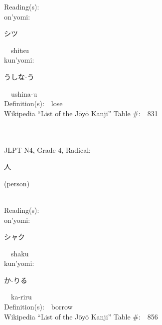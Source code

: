 \begin{multicols}{2}
Reading(s):\ \ \\
{\hspace*{1em}}on'yomi:\ \ \\
{\hspace*{2em}}{\begin{CJK}{UTF8}{min} シツ \end{CJK}}\ \ shitsu\ \ \\
{\hspace*{1em}}kun'yomi:\ \ \\
{\hspace*{2em}}{\begin{CJK}{UTF8}{min} うしな-う \end{CJK}}\ \ ushina-u\ \ \\
Definition(s):\ \ lose \\
Wikipedia ``List of the J\=oy\=o Kanji'' Table \#:\ \ 831 \\
\ \ \\
{\fontsize{34pt}{40pt}  }\ \ \\  %
{JLPT N4, Grade 4, Radical:\ \ {\begin{CJK}{UTF8}{min} 人 \end{CJK}} (person) } \\
Reading(s):\ \ \\
{\hspace*{1em}}on'yomi:\ \ \\
{\hspace*{2em}}{\begin{CJK}{UTF8}{min} シャク \end{CJK}}\ \ shaku\ \ \\
{\hspace*{1em}}kun'yomi:\ \ \\
{\hspace*{2em}}{\begin{CJK}{UTF8}{min} か-りる \end{CJK}}\ \ ka-riru\ \ \\
Definition(s):\ \ borrow \\
Wikipedia ``List of the J\=oy\=o Kanji'' Table \#:\ \ 856 \\
\ \ \\
{\fontsize{34pt}{40pt}  }\ \ \\  %

\end{multicols}
